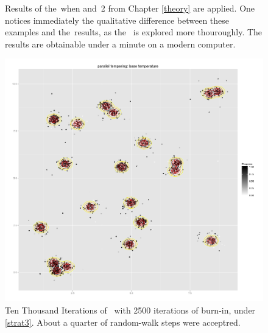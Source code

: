 \begin{figure}
\begin{minipage}[b]{.5\linewidth}
	\end{minipage}
	\caption[\PT\, with \strat\,1 and \strat\,2]{Results of the \PT\,when  and \strat\,2 from Chapter \ref{theory} are applied. One notices immediately the qualitative difference between these examples and the \MH\,results, as the \sspace\, is explored more thouroughly. The results are obtainable under a minute on a modern computer.}\label{PTshort}
\end{figure}

\begin{figure}[ht]
	\centering 
	\includegraphics[width=\textwidth,keepaspectratio]{./img/PT10000Motivation.png}
	\caption[Ten Thousand Iterations of \PT]{Ten Thousand Iterations of \PT\, with 2500 iterations of burn-in, under \ref{strat3}. About a quarter of random-walk steps were acceptred.}\label{PTlong}
\end{figure}